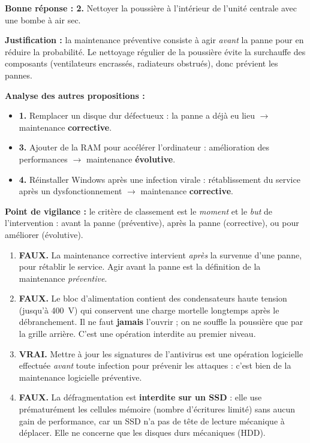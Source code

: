 \documentclass[11pt]{article}
\newcommand{\cle}[1]{{\popxbold\color{popdark}#1}}
\begin{document}
\begin{corrige}
\textbf{Bonne réponse : 2.} Nettoyer la poussière à l'intérieur de l'unité centrale avec une bombe à air sec.

\textbf{Justification :} la maintenance \cle{préventive} consiste à agir \emph{avant} la panne pour en réduire la probabilité. Le nettoyage régulier de la poussière évite la surchauffe des composants (ventilateurs encrassés, radiateurs obstrués), donc prévient les pannes.

\textbf{Analyse des autres propositions :}
\begin{itemize}
    \item \textbf{1.} Remplacer un disque dur défectueux : la panne a déjà eu lieu $\to$ maintenance \textbf{corrective}.
    \item \textbf{3.} Ajouter de la RAM pour accélérer l'ordinateur : amélioration des performances $\to$ maintenance \textbf{évolutive}.
    \item \textbf{4.} Réinstaller Windows après une infection virale : rétablissement du service après un dysfonctionnement $\to$ maintenance \textbf{corrective}.
\end{itemize}

\textbf{Point de vigilance :} le critère de classement est le \emph{moment} et le \emph{but} de l'intervention : avant la panne (préventive), après la panne (corrective), ou pour améliorer (évolutive).
\end{corrige}

\begin{corrige}
\begin{enumerate}
    \item \textbf{FAUX.} La maintenance corrective intervient \emph{après} la survenue d'une panne, pour rétablir le service. Agir avant la panne est la définition de la maintenance \emph{préventive}.
    \item \textbf{FAUX.} Le bloc d'alimentation contient des condensateurs haute tension (jusqu'à 400~V) qui conservent une charge mortelle longtemps après le débranchement. Il ne faut \textbf{jamais} l'ouvrir ; on ne souffle la poussière que par la grille arrière. C'est une opération interdite au premier niveau.
    \item \textbf{VRAI.} Mettre à jour les signatures de l'antivirus est une opération logicielle effectuée \emph{avant} toute infection pour prévenir les attaques : c'est bien de la maintenance logicielle préventive.
    \item \textbf{FAUX.} La défragmentation est \textbf{interdite sur un SSD} : elle use prématurément les cellules mémoire (nombre d'écritures limité) sans aucun gain de performance, car un SSD n'a pas de tête de lecture mécanique à déplacer. Elle ne concerne que les disques durs mécaniques (HDD).
\end{enumerate}
\end{corrige}
\end{document}
